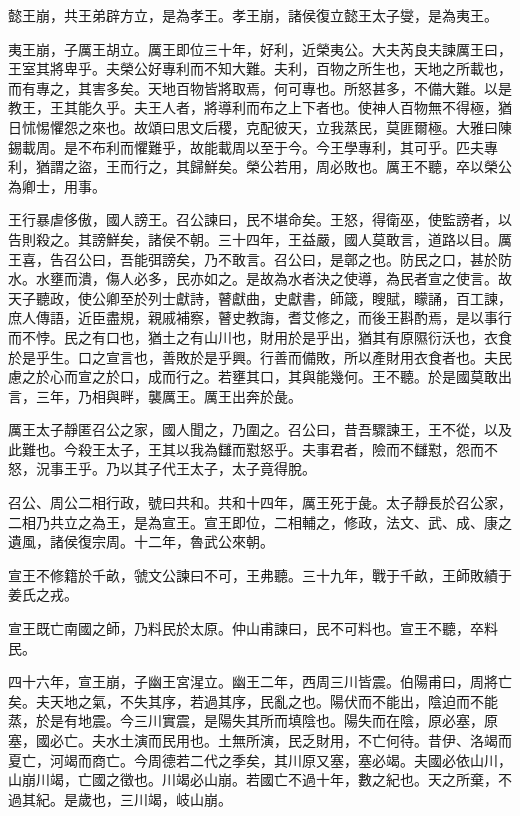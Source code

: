 懿王崩，共王弟辟方立，是為孝王。孝王崩，諸侯復立懿王太子燮，是為夷王。

夷王崩，子厲王胡立。厲王即位三十年，好利，近榮夷公。大夫芮良夫諫厲王曰，王室其將卑乎。夫榮公好專利而不知大難。夫利，百物之所生也，天地之所載也，而有專之，其害多矣。天地百物皆將取焉，何可專也。所怒甚多，不備大難。以是教王，王其能久乎。夫王人者，將導利而布之上下者也。使神人百物無不得極，猶日怵惕懼怨之來也。故頌曰思文后稷，克配彼天，立我蒸民，莫匪爾極。大雅曰陳錫載周。是不布利而懼難乎，故能載周以至于今。今王學專利，其可乎。匹夫專利，猶謂之盜，王而行之，其歸鮮矣。榮公若用，周必敗也。厲王不聽，卒以榮公為卿士，用事。

王行暴虐侈傲，國人謗王。召公諫曰，民不堪命矣。王怒，得衛巫，使監謗者，以告則殺之。其謗鮮矣，諸侯不朝。三十四年，王益嚴，國人莫敢言，道路以目。厲王喜，告召公曰，吾能弭謗矣，乃不敢言。召公曰，是鄣之也。防民之口，甚於防水。水壅而潰，傷人必多，民亦如之。是故為水者決之使導，為民者宣之使言。故天子聽政，使公卿至於列士獻詩，瞽獻曲，史獻書，師箴，瞍賦，矇誦，百工諫，庶人傳語，近臣盡規，親戚補察，瞽史教誨，耆艾修之，而後王斟酌焉，是以事行而不悖。民之有口也，猶土之有山川也，財用於是乎出，猶其有原隰衍沃也，衣食於是乎生。口之宣言也，善敗於是乎興。行善而備敗，所以產財用衣食者也。夫民慮之於心而宣之於口，成而行之。若壅其口，其與能幾何。王不聽。於是國莫敢出言，三年，乃相與畔，襲厲王。厲王出奔於彘。

厲王太子靜匿召公之家，國人聞之，乃圍之。召公曰，昔吾驟諫王，王不從，以及此難也。今殺王太子，王其以我為讎而懟怒乎。夫事君者，險而不讎懟，怨而不怒，況事王乎。乃以其子代王太子，太子竟得脫。

召公、周公二相行政，號曰共和。共和十四年，厲王死于彘。太子靜長於召公家，二相乃共立之為王，是為宣王。宣王即位，二相輔之，修政，法文、武、成、康之遺風，諸侯復宗周。十二年，魯武公來朝。

宣王不修籍於千畝，虢文公諫曰不可，王弗聽。三十九年，戰于千畝，王師敗績于姜氏之戎。

宣王既亡南國之師，乃料民於太原。仲山甫諫曰，民不可料也。宣王不聽，卒料民。

四十六年，宣王崩，子幽王宮湦立。幽王二年，西周三川皆震。伯陽甫曰，周將亡矣。夫天地之氣，不失其序，若過其序，民亂之也。陽伏而不能出，陰迫而不能蒸，於是有地震。今三川實震，是陽失其所而填陰也。陽失而在陰，原必塞，原塞，國必亡。夫水土演而民用也。土無所演，民乏財用，不亡何待。昔伊、洛竭而夏亡，河竭而商亡。今周德若二代之季矣，其川原又塞，塞必竭。夫國必依山川，山崩川竭，亡國之徵也。川竭必山崩。若國亡不過十年，數之紀也。天之所棄，不過其紀。是歲也，三川竭，岐山崩。

